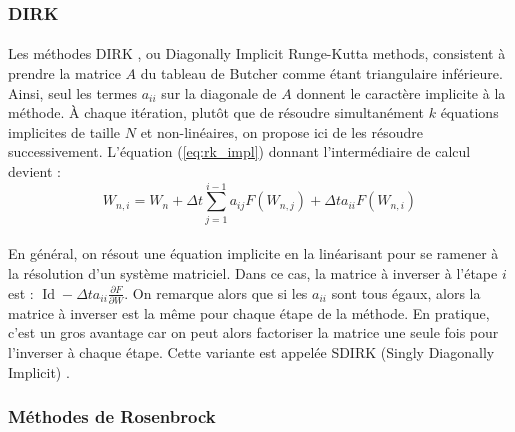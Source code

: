     \subsubsection{DIRK}

      \paragraph{}
      Les méthodes DIRK \cite{Alexander1977}, ou Diagonally Implicit Runge-Kutta methods, consistent à prendre la matrice $A$ du tableau de Butcher comme étant triangulaire inférieure.
      Ainsi, seul les termes $a_{ii}$ sur la diagonale de $A$ donnent le caractère implicite à la méthode.
      À chaque itération, plutôt que de résoudre simultanément $k$ équations implicites de taille $N$ et non-linéaires, on propose ici de les résoudre successivement.
      L'équation (\ref{eq:rk_impl}) donnant l'intermédiaire de calcul devient :
      \begin{equation}\label{eq:rk_dirk}
        W_{n,i} = W_n + \Delta t\sum_{j = 1}^{i-1}a_{ij}F\left(W_{n,j}\right) + \Delta ta_{ii}F\left(W_{n,i}\right)
      \end{equation}

      \paragraph{}
      En général, on résout une équation implicite en la linéarisant pour se ramener à la résolution d'un système matriciel.
      Dans ce cas, la matrice à inverser à l'étape $i$ est : $\operatorname{Id} - \Delta ta_{ii}\frac{\partial F}{\partial W}$.
      On remarque alors que si les $a_{ii}$ sont tous égaux, alors la matrice à inverser est la même pour chaque étape de la méthode.
      En pratique, c'est un gros avantage car on peut alors factoriser la matrice une seule fois pour l'inverser à chaque étape.
      Cette variante est appelée SDIRK (Singly Diagonally Implicit) \cite{HairerWanner1996}.


    \subsubsection{Méthodes de Rosenbrock}

